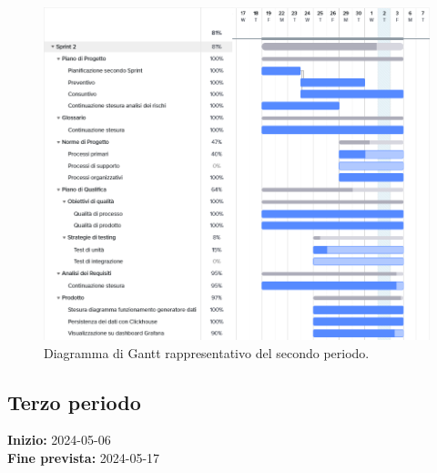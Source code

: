 \begin{figure}[h]
    \centering
    \includegraphics[width=13cm]{./asset/gantt2.png}
    \caption{Diagramma di Gantt rappresentativo del secondo periodo.}
    \label{figure:Diagramma di Gantt rappresentativo del secondo periodo}
\end{figure}
\newpage
\clearpage
\subsection{Terzo periodo} \label{sec:3_rtb}
\textbf{Inizio:} 2024-05-06\\
\textbf{Fine prevista:} 2024-05-17
